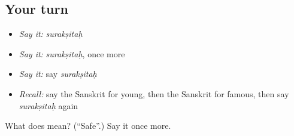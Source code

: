 \subsection*{Your turn}
\begin{itemize}
\raggedright
  \item \emph{Say it:} \emph{surakṣitaḥ}
  \item \emph{Say it:} \emph{surakṣitaḥ}, once more
  \item \emph{Say it:} say \emph{surakṣitaḥ}
  \item \emph{Recall:} say the Sanskrit for young, then the Sanskrit for famous, then say \emph{surakṣitaḥ} again
\end{itemize}

\begin{tcolorbox}[breakable,colback=teal!4,colframe=teal!35!black,title={Before you move on}]
What does  mean? (\textquotedblleft{}Safe\textquotedblright{}.) Say it once more.
\end{tcolorbox}
